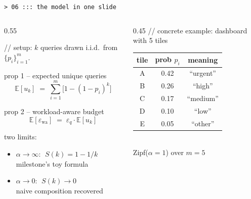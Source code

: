 \documentclass[aspectratio=169,10pt]{beamer}
\newcommand{\eps}{\varepsilon}
\newcommand{\E}{\mathbb{E}}
\newcommand{\dimt}[1]{\textcolor{dim}{#1}}
\begin{document}
\begin{frame}{\texttt{> 06 ::: the model in one slide}}

\begin{columns}[T,onlytextwidth]
\begin{column}{0.55\textwidth}

{\color{dim}\ttfamily\small // setup: $k$ queries drawn i.i.d.\ from $\{p_i\}_{i=1}^m$.}

\vspace{0.3em}
\begin{block}{\ttfamily\small prop 1 -- expected unique queries}
\[
\E[u_k] \;=\; \sum_{i=1}^m \bigl[1 - (1-p_i)^k\bigr]
\]
\end{block}

\begin{block}{\ttfamily\small prop 2 -- workload-aware budget}
\[
\E[\eps_\text{wa}] \;=\; \eps_q \cdot \E[u_k]
\]
\end{block}

{\color{neon}\ttfamily\small two limits:}
\begin{itemize}\small
  \item $\alpha \to \infty$: $\;S(k) = 1 - 1/k$ \\
        \dimt{milestone's toy formula}
  \item $\alpha \to 0$: $\;S(k) \to 0$ \\
        \dimt{naive composition recovered}
\end{itemize}

\end{column}

\begin{column}{0.45\textwidth}
\centering
{\color{dim}\ttfamily\small // concrete example: dashboard with 5 tiles}\\[0.3em]
\begin{tabular}{c|c|c}
\toprule
{\color{cyan}tile} & {\color{cyan}prob $p_i$} & {\color{cyan}meaning} \\
\midrule
A & {\color{neon}0.42} & ``urgent'' \\
B & {\color{neon}0.26} & ``high'' \\
C & {\color{neon}0.17} & ``medium'' \\
D & {\color{yellow}0.10} & ``low'' \\
E & {\color{magenta}0.05} & ``other'' \\
\bottomrule
\end{tabular}\\[0.5em]
{\color{dim}\ttfamily\scriptsize Zipf($\alpha=1$) over $m=5$}\\[0.5em]


\end{column}
\end{columns}
\end{frame}
\end{document}
